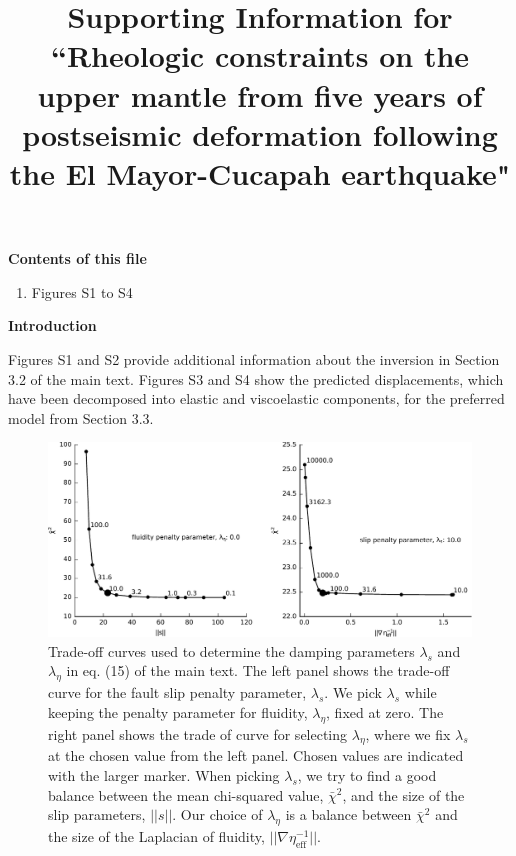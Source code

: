 \documentclass[draft,jgrga]{agutex}
\begin{document}
\title{Supporting Information for ``Rheologic constraints on the upper mantle from five years of postseismic deformation following the El Mayor-Cucapah earthquake"}



\begin{article}

\noindent\textbf{Contents of this file}
\begin{enumerate}
\item Figures S1 to S4
\end{enumerate}
\noindent\textbf{Introduction}

Figures S1 and S2 provide additional information about the inversion in Section 3.2 of the main text. Figures S3 and S4 show the predicted displacements, which have been decomposed into elastic and viscoelastic components, for the preferred model from Section 3.3.  
  
\end{article}
\clearpage


\begin{figure}
\noindent\includegraphics[scale=1.0]{Figures/2016jb013114-fS01}
\caption{
Trade-off curves used to determine the damping parameters $\lambda_s$ and $\lambda_\eta$ in eq. (15) of the main text.  The left panel shows the trade-off curve for the fault slip penalty parameter, $\lambda_s$.  We pick $\lambda_s$ while keeping the penalty parameter for fluidity, $\lambda_\eta$, fixed at zero.  The right panel shows the trade of curve for selecting $\lambda_\eta$, where we fix $\lambda_s$ at the chosen value from the left panel. Chosen values are indicated with the larger marker.  When picking $\lambda_s$, we try to find a good balance between the mean chi-squared value, $\bar{\chi}^2$, and the size of the slip parameters, $||s||$.  Our choice of $\lambda_\eta$ is a balance between $\bar{\chi}^2$ and the size of the Laplacian of fluidity, $||\nabla \eta_\mathrm{eff}^{-1}||$. 
}
\label{fig:S1}
\end{figure}
\end{document}

